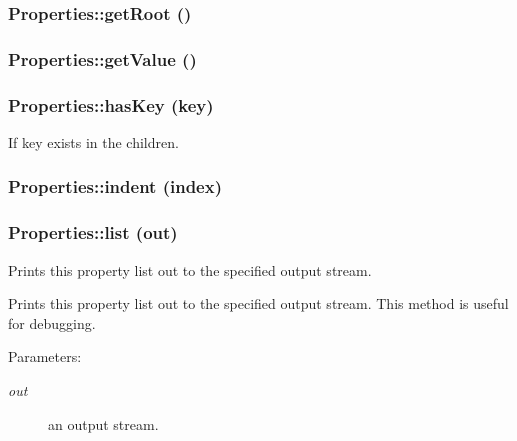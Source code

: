 \subsubsection{\setlength{\rightskip}{0pt plus 5cm}Properties::get\-Root ()}\label{classProperties_Propertiesa7}


\subsubsection{\setlength{\rightskip}{0pt plus 5cm}Properties::get\-Value ()}\label{classProperties_Propertiesa4}


\subsubsection{\setlength{\rightskip}{0pt plus 5cm}Properties::has\-Key (key)}\label{classProperties_Propertiesa22}


If key exists in the children. 

\subsubsection{\setlength{\rightskip}{0pt plus 5cm}Properties::indent (index)}\label{classProperties_Propertiesa30}


\subsubsection{\setlength{\rightskip}{0pt plus 5cm}Properties::list (out)}\label{classProperties_Propertiesa13}


Prints this property list out to the specified output stream. 

Prints this property list out to the specified output stream. This method is useful for debugging.

\begin{Desc}
\item[Parameters:]
\begin{description}
\item[{\em out}]an output stream.\end{description}
\end{Desc}
